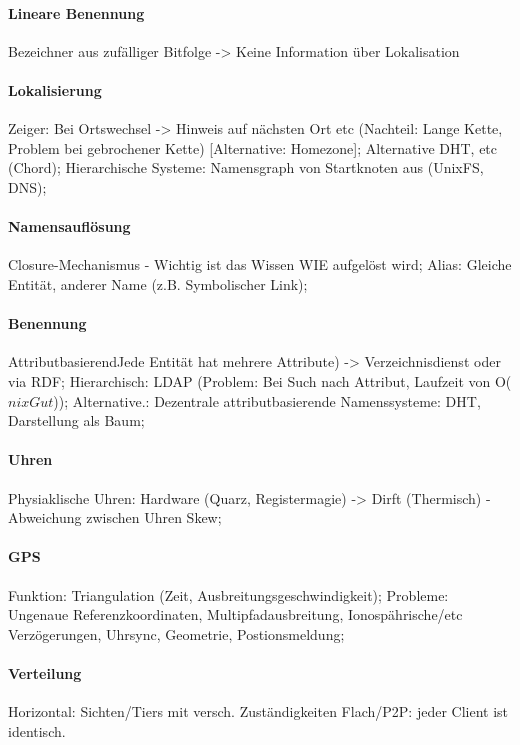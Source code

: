 \documentclass[pagesize,11pt,a4paper]{scrartcl}
\begin{document}
\paragraph*{Lineare Benennung}
	Bezeichner aus zufälliger Bitfolge -> Keine Information über Lokalisation

\paragraph*{Lokalisierung}
	Zeiger: Bei Ortswechsel -> Hinweis auf nächsten Ort etc (Nachteil: Lange Kette, Problem bei gebrochener Kette) [Alternative: Homezone];
	Alternative DHT, etc (Chord);
	Hierarchische Systeme: Namensgraph von Startknoten aus (UnixFS, DNS);

\paragraph*{Namensauflösung}
	Closure-Mechanismus - Wichtig ist das Wissen WIE aufgelöst wird;
	Alias: Gleiche Entität, anderer Name (z.B. Symbolischer Link);

\paragraph*{Benennung}
	AttributbasierendJede Entität hat mehrere Attribute) -> Verzeichnisdienst oder via RDF;
	Hierarchisch: LDAP (Problem: Bei Such nach Attribut, Laufzeit von O($nixGut$));
	Alternative.: Dezentrale attributbasierende Namenssysteme: DHT, Darstellung als Baum;

\paragraph*{Uhren}
	Physiaklische Uhren: Hardware (Quarz, Registermagie) -> Dirft (Thermisch) - Abweichung zwischen Uhren Skew;

\paragraph*{GPS}
	Funktion: Triangulation (Zeit, Ausbreitungsgeschwindigkeit);
	Probleme: Ungenaue Referenzkoordinaten, Multipfadausbreitung, Ionospährische/etc Verzögerungen, Uhrsync, Geometrie, Postionsmeldung;
	
\paragraph*{Verteilung}
	Horizontal: Sichten/Tiers mit versch. Zuständigkeiten
	Flach/P2P: jeder Client ist identisch.
\end{document}
